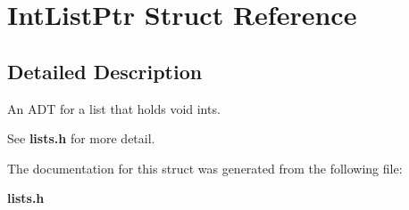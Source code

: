 \section{Int\-List\-Ptr Struct Reference}
\label{structIntListPtr}


\subsection{Detailed Description}
An ADT for a list that holds void ints. 

See {\bf lists.h} for more detail. 



The documentation for this struct was generated from the following file:\begin{CompactItemize}
\item 
{\bf lists.h}\end{CompactItemize}
